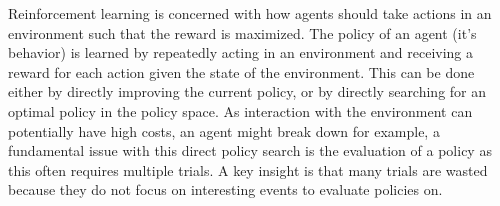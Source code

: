 


Reinforcement learning is concerned with how agents should take actions in an environment such that the reward is maximized. The policy of an agent (it's behavior) is learned by repeatedly acting in an environment and receiving a reward for each action given the state of the environment. This can be done either by directly improving the current policy, or by directly searching for an optimal policy in the policy space. As interaction with the environment can potentially have high costs, an agent might break down for example, a fundamental issue with this direct policy search is the evaluation of a policy as this often requires multiple trials. A key insight is that many trials are wasted because they do not focus on interesting events to evaluate policies on. 

